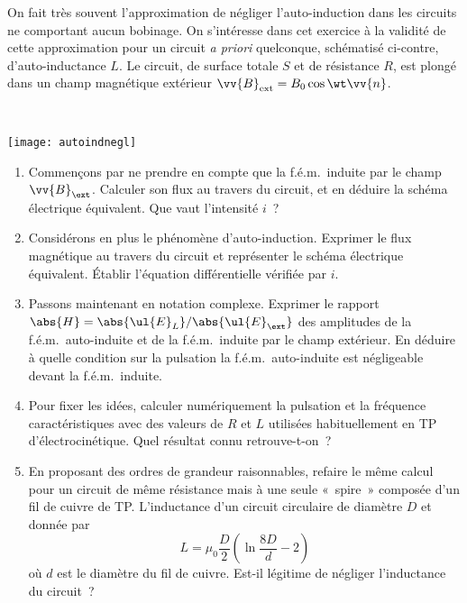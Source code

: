 \documentclass[a4paper, 10pt, final, garamond]{book}
\begin{document}
\noindent
\begin{minipage}[t]{.6\linewidth}
	On fait très souvent l'approximation de négliger l'auto-induction dans les
	circuits ne comportant aucun bobinage. On s'intéresse dans cet exercice à la
	validité de cette approximation pour un circuit \textit{a priori} quelconque,
	schématisé ci-contre, d'auto-inductance $L$. Le circuit, de surface totale $S$
	et de résistance $R$, est plongé dans un champ magnétique extérieur $\vv{B}_{\rm
			ext} = B_0 \cos{\wt}\vv{n}$.
\end{minipage}
\hfill
\begin{minipage}[t]{.39\linewidth}
	~
	\vspace{-10pt}
	\begin{center}
		\texttt{[image: autoindnegl]}
		\label{fig:autoindnegl}
	\end{center}
\end{minipage}

\begin{enumerate}
	\item Commençons par ne prendre en compte que la f.é.m.\ induite par le champ
	      $\vv{B}_{\ext}$. Calculer son flux au travers du circuit, et en déduire la
	      schéma électrique équivalent. Que vaut l'intensité $i$~?
	\item Considérons en plus le phénomène d'auto-induction. Exprimer le flux
	      magnétique au travers du circuit et représenter le schéma électrique
	      équivalent. Établir l'équation différentielle vérifiée par $i$.
	\item Passons maintenant en notation complexe. Exprimer le rapport $\abs{H} =
		      \abs{\ul{E}_L}/\abs{\ul{E}_{\ext}}$ des amplitudes de la f.é.m.\
	      auto-induite et de la f.é.m.\ induite par le champ extérieur. En déduire à
	      quelle condition sur la pulsation la f.é.m.\ auto-induite est négligeable
	      devant la f.é.m.\ induite.
	\item Pour fixer les idées, calculer numériquement la pulsation et la
	      fréquence caractéristiques avec des valeurs de $R$ et $L$ utilisées
	      habituellement en TP d'électrocinétique. Quel résultat connu retrouve-t-on~?
	\item En proposant des ordres de grandeur raisonnables, refaire le même calcul
	      pour un circuit de même résistance mais à une seule «~spire~» composée d'un
	      fil de cuivre de TP. L'inductance d'un circuit circulaire de diamètre $D$ et
	      donnée par
	      \[
		      L = \mu_0 \frac{D}{2} \left( \ln \frac{8D}{d} - 2 \right)
	      \]
	      où $d$ est le diamètre du fil de cuivre. Est-il légitime de négliger
	      l'inductance du circuit~?
\end{enumerate}
\end{document}
